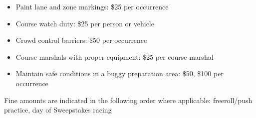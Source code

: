 \begin{appendices}
\begin{itemize}
			\item Paint lane and zone markings: \$25 per occurrence

			\item Course watch duty: \$25 per person or vehicle

			\item Crowd control barriers: \$50 per occurrence

			\item Course marshals with proper equipment: \$25 per course marshal
			
			\item Maintain safe conditions in a buggy preparation area: \$50, \$100 per occurrence

		\end{itemize}

		Fine amounts are indicated in the following order where applicable: freeroll/push practice, day of Sweepstakes racing
\end{appendices}
